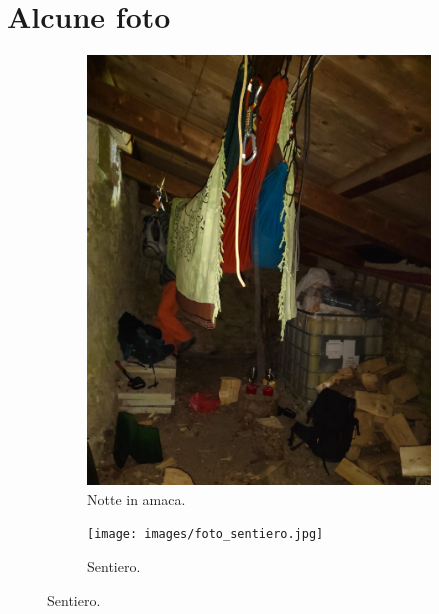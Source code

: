 \documentclass{article}
\begin{document}
\section{Alcune foto}

\begin{figure}[htbp!]
    \centering
    \begin{subfigure}{0.45\textwidth}
        \centering
        \includegraphics[width=\linewidth]{images/foto_amache.jpg}
        \caption{Notte in amaca.}
        \label{fig:foto1}
    \end{subfigure}
    \hfill 
    \begin{subfigure}{0.45\textwidth}
        \centering
        \texttt{[image: images/foto\_sentiero.jpg]}
        \caption{Sentiero.}
        \label{fig:foto2}
    \end{subfigure}
    
    \vspace{2em} 
    

\end{figure}
\end{document}
